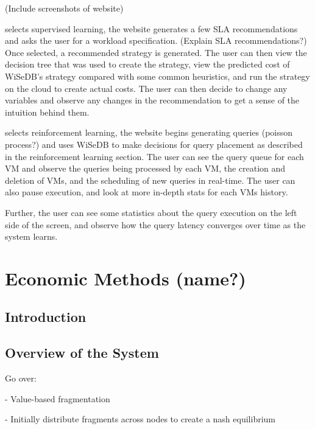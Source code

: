 \documentclass{tufte-book} %
\begin{document}
(Include screenshots of website)

 selects supervised learning, the website generates a few SLA recommendations and asks the user for a workload specification. (Explain SLA recommendations?) Once selected, a recommended strategy is generated. The user can then view the decision tree that was used to create the strategy, view the predicted cost of WiSeDB's strategy compared with some common heuristics, and run the strategy on the cloud to create actual costs. The user can then decide to change any variables and observe any changes in the recommendation to get a sense of the intuition behind them.

 selects reinforcement learning, the website begins generating queries (poisson process?) and uses WiSeDB to make decisions for query placement as described in the reinforcement learning section. The user can see the query queue for each VM and observe the queries being processed by each VM, the creation and deletion of VMs, and the scheduling of new queries in real-time. The user can also pause execution, and look at more in-depth stats for each VMs history.

Further, the user can see some statistics about the query execution on the left side of the screen, and observe how the query latency converges over time as the system learns.



\chapter{Economic Methods (name?)}

\section{Introduction}

\section{Overview of the System}

Go over:

- Value-based fragmentation

- Initially distribute fragments across nodes to create a nash equilibrium
\end{document}
